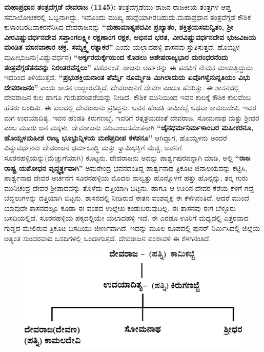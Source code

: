 \textbf{ಮಹಾಪ್ರಧಾನ ತಂತ್ರವೆಗ್ಗಡೆ ದೇವರಾಜ (1145):} ತಂತ್ರವೆಗ್ಗಡೆಯು ರಾಜನ ರಾಜಕೀಯ ತಂತ್ರಗಳ ಆಪ್ತ ಸಮಾಲೋಚಕ\-ರಲ್ಲಿ ಒಬ್ಬನಾಗಿದ್ದು, ಇದೊಂದು ಮುಖ್ಯ ಹುದ್ದೆಯಾಗಿರಬಹುದು.ಮಹಾಪ್ರಧಾನ ತಂತ್ರವೆಗ್ಗಡೆ ಕೌಶಿಕ ಕುಳಾಂಬರ\break ದಿವಾಕರನೆನಿಸಿದ ದೇವರಾಜನನ್ನು \textbf{“ಮಹಾಮಾತ್ಯಪದವೀ ಪ್ರಖ್ಯಾತಂ, ಶಕ್ತಿತ್ರಯಸಮನ್ವಿತಂ, ಶ‍್ರೀ ವೀರವಿಷ್ಣುವರ್ಧನದೇವ ಸಪ್ತಾಂಗಲಕ್ಷ್ಮೀ ರಕ್ಷಣಾಂಗ ರಕ್ಷಕ, ಅಭಿನವ ಭರತ, ವೀರವಿಷ್ಣುವರ್ಧನದೇವ ಭುಜವಿಜಯ ಮಂಡಿತ ಮಾನವಾಕಾರ ಚಕ್ರ, ಸಮ್ಯಕ್ತ್ವ ರತ್ನಾಕರ”} ಎಂದು ಯಲ್ಲಾದಹಳ್ಳಿ ಶಾಸನವು ಸ್ತುತಿಸುತ್ತದೆ. ಹೊಯ್ಸಳ ಮಹೀಭುಜನು(ವಿಷ್ಣುವರ್ಧನ) \textbf{“ಅರ್ಕ್ಕರದುರ್ಕ್ಕೆಯಿಂದ ಕೊಡಲು ಅಶೇಷರಾಜ್ಯಭಾರ ದುರಂಧರನೆಂದು ತಂತ್ರವೆಗ್ಗಡೆತನವನ್ನು ನಿರಂತರವೆನ್ನಲು”} ಪಡೆದನಂತೆ. ರಾಜನು ಅರ್ಹರನ್ನು ಈ ಪದವಿಗೆ ನೇಮಕ ಮಾಡುತ್ತಿದ್ದುದು ಇದರಿಂದ ತಿಳಿಯುತ್ತದೆ. \textbf{“ಪ್ರಭುಶಕ್ತಿಯನಾಂತ ಪೆರ್ಮ್ಮೆ ನೂರ್ಮ್ಮಡಿ ಮಿಗಿಲಾದುದು ಏವೊಗಳ್ವೆನುನ್ನತಿಯಂ ವಿಭು ದೇವರಾಜನಂ” }ಎಂದು ಶಾಸನ ಉದ್ಗಾರವೆತ್ತಿದೆ. ದೇವರಾಜನಿಗೆ ದೇವಣ ಎಂದೂ ಹೆಸರಿತ್ತು. ಈ ಶಾಸನದಲ್ಲಿ ದೇವರಾಜನ ಕುಲ ಹಾಗೂ ಗುರುಪರಂಪರೆಯನ್ನು ನೀಡಿದೆ. ಕೌಶಿಕ ಮುನಿಯಿಂದ ಇವನ ಕುಲಕ್ಕೆ ಕೌಶಿಕ ಕುಲವೆಂಬ ಹೆಸರು ಬಂದಿತು. ಈ ಕುಲದಲ್ಲಿ ದೇವರಾಜನು ಪ್ರಸಿದ್ಧನು. ಅವನ ಹೆಂಡತಿ ಕಾಮಿಕಬ್ಬೆ ಅಥವಾ ಕಾಮಲದೇವಿ. ಇವರ ಮಗ ಉದಯಾದಿತ್ಯ. ಇವನ ಹೆಂಡತಿ ಕಿರುಗಣಬ್ಬೆ. ಇವರಿಗೆ ರತ್ನತ್ರಯದಂತೆ ದೇವರಾಜ, ಸೋಮನಾಥ ಮತ್ತು ಶ‍್ರೀಧರ ಎಂಬ ಮೂರು ಜನ ಮಕ್ಕಳು. ದೇವರಾಜನು ಸಕುಟುಂಬಸಮೇತನಾಗಿ \textbf{“ಜೈನಧರ್ಮನಿರ್ಮಳಾಂಬರ ಮಹೀಕರನೂ, ಹೊಯ್ಸಳಮಹೀಶ ರಾಜ್ಯ ಭೂಭ್ರುನ್ನಿಳಯ ಮಣಿಪ್ರದೀಪ ಕಳಶನೂ”} ಆಗಿದ್ದಾಗ, ಹೊಯ್ಸಳನು ಅಂದರೆ ವಿಷ್ಣುವರ್ಧನನು ದೇವರಾಜನ ಧರ್ಮಬುದ್ಧಿ ಮತ್ತು ಸ್ವಾಮಿಭಕ್ತಿಗೆ ಮೆಚ್ಚಿ, ಅವನಿಗೆ ಸೂರನಹಳ್ಳಿಯನ್ನು(ಮೆಚ್ಚುಗೆಯಾಗಿ) ಕೊಟ್ಟನು. ದೇವರಾಜನು ಅದನ್ನು ಪಾರ್ಶ್ವಪುರವನ್ನಾಗಿ ಮಾಡಿ, ಅಲ್ಲಿ \textbf{“ರಾಜ ರಾಷ್ಟ್ರ ಯಶೋಧನ ವೃದ್ಧ್ಯರ್ತ್ಥವಾಗಿ” }ಅಮರೇಂದ್ರ ಭವನದಂತಿದ್ದ ಪಾರ್ಶ್ವನಾಥ ತ್ರಿಕೂಟ ಜಿನಾಲಯವನ್ನು ಕಟ್ಟಿಸಿ, ಪಾರ್ಶ್ವನಾಥ ದೇವರ ಅರ್ಚನೆಗೆ ಸೂರನಹಳ್ಳಿಯ ಮೊದಲ ನಾಲ್ವತ್ತು ಹೊನ್ನೊಳಗೆ ಹತ್ತು ಹೊನ್ನನ್ನು, ತನ್ನ ಗುರು ಮುನಿಚಂದ್ರ ದೇವರ ಶ‍್ರೀಪಾದವನ್ನು ತೊಳೆದು ದತ್ತಿಯಾಗಿ ಬಿಟ್ಟನು. ಹಾಗೂ ಆ ಊರಿನ ದೇವರ ಕೆರೆಯ ಕೆಳಗೆ ಗದ್ದೆ ಬೆದ್ದಲುಗಳನ್ನು ದತ್ತಿಯಾಗಿ ಬಿಟ್ಟನು. ಶಾಸನದಲ್ಲಿ ನೀಡಿರುವ ಈತನ ವಂಶವೃಕ್ಷ ಈ ಕೆಳಗಿನಂತಿದೆ. ಆದರೆ ಮುಂದೆ ಯಾವುದೇ ಶಾಸನದಲ್ಲೂ ಕೂಡಾ ಈ ವಂಶದ ಉಲ್ಲೇಖ ಕಂಡುಬರುವುದಿಲ್ಲ. ಈ ಶಾಸನವು ಈಗ ಬೆಳ್ಳೂರು ಬಸದಿಯಲ್ಲಿದೆ. ಸೂರನಹಳ್ಳಿಯ ಪಕ್ಕದಲ್ಲಿಯೇ ಯಲಾದಹಳ್ಳಿ ಇದೆ. ಈ ಎರಡೂ ಊರಿಗೆ ಮಧ್ಯದಲ್ಲಿ ಎತ್ತರವಾದ ಗುಡ್ಡದ ಮೇಲಿರುವ ತ್ರಿಕೂಟ ಬಸದಿಯು ಜೀರ್ಣವಾಗಿದೆ. ಇದನ್ನು ಮೂಲ ರೂಪದಲ್ಲಿ ಪುನರ್ ನಿರ್ಮಿಸಿದಲ್ಲಿ ಜಿಲ್ಲೆಯ ಅತ್ಯಂತ ಸುಂದರವಾದ ಬಸದಿಗಳಲ್ಲಿ ಒಂದಾಗುತ್ತದೆ. ದೇವರಾಜನ ವಂಶಾವಳಿ ಈ ಕೆಳಗಿನಂತಿದೆ.

\begin{figure}[H]
\includegraphics[scale=1.15]{images/chap3/chap3fig15.jpeg}
\end{figure}

